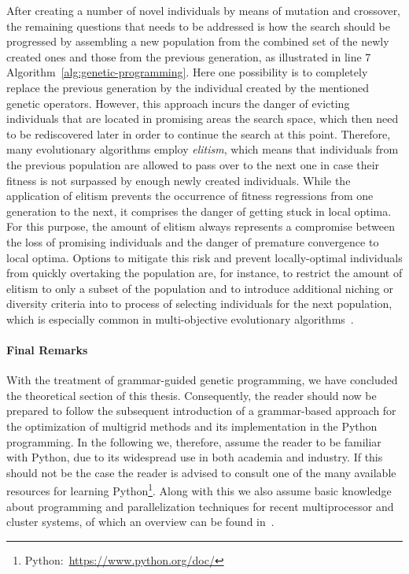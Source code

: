 After creating a number of novel individuals by means of mutation and crossover, the remaining questions that needs to be addressed is how the search should be progressed by assembling a new population from the combined set of the newly created ones and those from the previous generation, as illustrated in line 7 Algorithm~\ref{alg:genetic-programming}.
Here one possibility is to completely replace the previous generation by the individual created by the mentioned genetic operators.
However, this approach incurs the danger of evicting individuals that are located in promising areas the search space, which then need to be rediscovered later in order to continue the search at this point.
Therefore, many evolutionary algorithms employ \emph{elitism}, which means that individuals from the previous population are allowed to pass over to the next one in case their fitness is not surpassed by enough newly created individuals.
While the application of elitism prevents the occurrence of fitness regressions from one generation to the next, it comprises the danger of getting stuck in local optima.
For this purpose, the amount of elitism always represents a compromise between the loss of promising individuals and the danger of premature convergence to local optima.
Options to mitigate this risk and prevent locally-optimal individuals from quickly overtaking the population are, for instance, to restrict the amount of elitism to only a subset of the population and to introduce additional niching or diversity criteria into to process of selecting individuals for the next population, which is especially common in multi-objective evolutionary algorithms~\cite{coello2007evolutionary}.

\paragraph{Final Remarks}
With the treatment of grammar-guided genetic programming, we have concluded the theoretical section of this thesis.
Consequently, the reader should now be prepared to follow the subsequent introduction of a grammar-based approach for the optimization of multigrid methods and its implementation in the Python programming.
In the following we, therefore, assume the reader to be familiar with Python, due to its widespread use in both academia and industry.
If this should not be the case the reader is advised to consult one of the many available resources for learning Python\footnote{Python:~\url{https://www.python.org/doc/}}.
Along with this we also assume basic knowledge about programming and parallelization techniques for recent multiprocessor and cluster systems, of which an overview can be found in~\cite{sterling2017high,hager2010introduction}.

